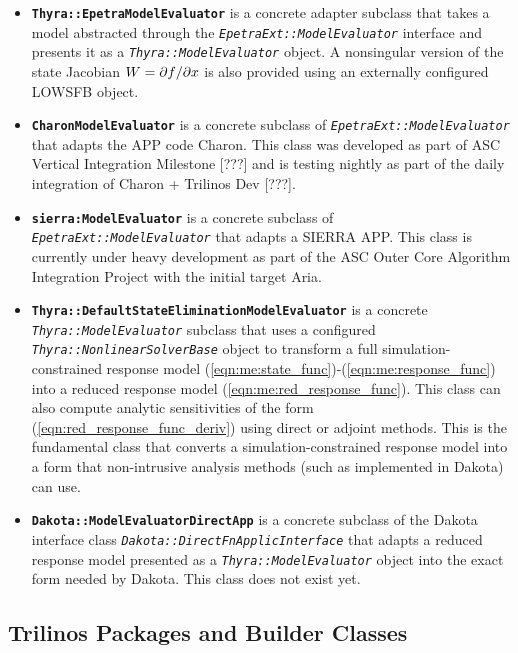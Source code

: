 \documentclass[pdf,ps2pdf,11pt]{SANDreport}
\begin{document}
\begin{itemize}
{}\item\textbf{\texttt{Thyra::EpetraModelEvaluator}} is a concrete adapter
subclass that takes a model abstracted through the
{}\texttt{\textit{Epetra\-Ext\-::Model\-Evaluator}} interface and presents it
as a {}\texttt{\textit{Thyra\-::Model\-Evaluator}} object.  A nonsingular
version of the state Jacobian $W=\partial f / \partial x$ is also provided using an
externally configured LOWSFB object.

{}\item\textbf{\texttt{CharonModelEvaluator}} is a concrete subclass of
{}\texttt{\textit{Epetra\-Ext::\-Model\-Evaluator}} that adapts the APP code
Charon.  This class was developed as part of ASC Vertical Integration
Milestone [???] and is testing nightly as part of the daily integration of
Charon + Trilinos Dev [???].

{}\item\textbf{\texttt{sierra:ModelEvaluator}} is a concrete subclass of
{}\texttt{\textit{Epetra\-Ext::\-Model\-Evaluator}} that adapts a SIERRA APP.
This class is currently under heavy development as part of the ASC Outer Core
Algorithm Integration Project with the initial target Aria.

{}\item\textbf{\texttt{Thyra::DefaultStateEliminationModelEvaluator}} is a
concrete {}\texttt{\textit{Thyra\-::Model\-Evaluator}} subclass that uses a
configured {}\texttt{\textit{Thyra\-::Nonlinear\-Solver\-Base}} object to
transform a full simulation-constrained response model
(\ref{eqn:me:state_func})-(\ref{eqn:me:response_func}) into a reduced response
model (\ref{eqn:me:red_response_func}).  This class can also compute analytic
sensitivities of the form (\ref{eqn:red_response_func_deriv}) using direct or
adjoint methods.  This is the fundamental class that converts a
simulation-constrained response model into a form that non-intrusive analysis
methods (such as implemented in Dakota) can use.

{}\item\textbf{\texttt{Dakota::ModelEvaluatorDirectApp}} is a concrete
subclass of the Dakota interface class
{}\texttt{\textit{Dakota\-::Direct\-Fn\-Applic\-Interface}} that adapts a
reduced response model presented as a
{}\texttt{\textit{Thyra\-::Model\-Evaluator}} object into the exact form
needed by Dakota.  This class does not exist yet.

\end{itemize}


%
\subsection{Trilinos Packages and Builder Classes}
%
\end{document}
